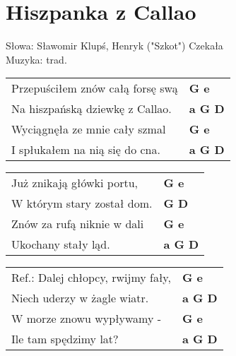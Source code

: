 \section{Hiszpanka z Callao}

Słowa: Sławomir Klupś, Henryk ("Szkot") Czekała\\
Muzyka:  trad.

\vspace{2em}
\begin{tabular}{@{}p{7cm}@{}l@{}}
Przepuściłem znów całą forsę swą  & \bfseries   G e \\
Na hiszpańską dziewkę z Callao.  & \bfseries   a G D \\
Wyciągnęła ze mnie cały szmal  & \bfseries   G e \\
I spłukałem na nią się do cna.  & \bfseries   a G D \\
\end{tabular}

\vspace{1em}
\begin{tabular}{@{}p{7cm}@{}l@{}}
Już znikają główki portu,  & \bfseries   G e \\
W którym stary został dom.  & \bfseries   G D \\
Znów za rufą niknie w dali  & \bfseries   G e \\
Ukochany stały ląd.  & \bfseries   a G D \\
\end{tabular}

\vspace{1em}
\begin{tabular}{@{}p{7cm}@{}l@{}}
Ref.: Dalej chłopcy, rwijmy fały,  & \bfseries   G e \\
Niech uderzy w żagle wiatr.  & \bfseries   a G D \\
W morze znowu wypływamy -  & \bfseries   G e \\
Ile tam spędzimy lat?  & \bfseries   a G D \\
\end{tabular}

